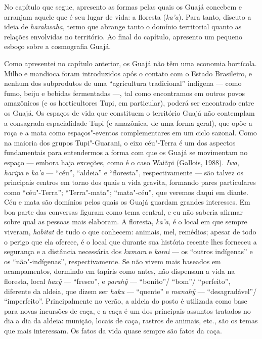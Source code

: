 No capítulo que segue, apresento as formas pelas quais os Guajá concebem
e arranjam aquele que é seu lugar de vida: a floresta (\emph{ka'a}).
Para tanto, discuto a ideia de \emph{harakwaha}, termo que abrange tanto
o domínio territorial quanto as relações envolvidas no território. Ao
final do capítulo, apresento um pequeno esboço sobre a cosmografia
Guajá.

Como apresentei no capítulo anterior, os Guajá não têm uma economia
hortícola. Milho e mandioca foram introduzidos após o contato com o
Estado Brasileiro, e nenhum dos subprodutos de uma ``agricultura
tradicional'' indígena --- como fumo, beiju e bebidas fermentadas ---, tal
como encontramos em outros povos amazônicos (e os horticultores Tupi, em
particular), poderá ser encontrado entre os Guajá. Os espaços de vida
que constituem o território Guajá não contemplam a consagrada
espacialidade Tupi (e amazônica, de uma forma geral), que opõe a roça e
a mata como espaços"-eventos complementares em um ciclo sazonal. Como na
maioria dos grupos Tupi"-Guarani, o eixo céu"-Terra é um dos aspectos
fundamentais para entendermos a forma com que os Guajá se movimentam no
espaço --- embora haja exceções, como é o caso Waiãpi (Gallois, 1988).
\emph{Iwa}, \emph{haripa} e \emph{ka'a} --- ``céu'', ``aldeia'' e ``floresta'',
respectivamente --- são talvez os principais centros em torno dos quais a
vida gravita, formando pares particulares como ``céu"-Terra'';
``Terra"-mata''; ``mata"-céu'', que veremos daqui em diante. Céu e mata são
domínios pelos quais os Guajá guardam grandes interesses. Em boa parte
das conversas figuram como tema central, e eu não saberia afirmar sobre
qual as pessoas mais elaboram. A floresta, \emph{ka'a}, é o local em que
sempre viveram, \emph{habitat} de tudo o que conhecem: animais, mel,
remédios; apesar de todo o perigo que ela oferece, é o local que durante
sua história recente lhes forneceu a segurança e a distância necessária
dos \emph{kamara} e \emph{karai} --- os ``outros indígenas'' e os
``não"-indígenas'', respectivamente. Se não vivem mais baseados em
acampamentos, dormindo em tapiris como antes, não dispensam a vida na
floresta, local \emph{haxỹ} --- ``fresco'', e \emph{parahỹ} --- ``bonito''/
``bom''/ ``perfeito'', diferente da aldeia, que dizem ser \emph{haku} ---
``quente'' e \emph{manahỹ} --- ``desagradável''/ ``imperfeito''. Principalmente
no verão, a aldeia do posto é utilizada como base para novas incursões
de caça, e a caça é um dos principais assuntos tratados no dia a dia da
aldeia: munição, locais de caça, rastros de animais, etc., são os temas
que mais interessam. Os fatos da vida quase sempre são fatos da caça.

